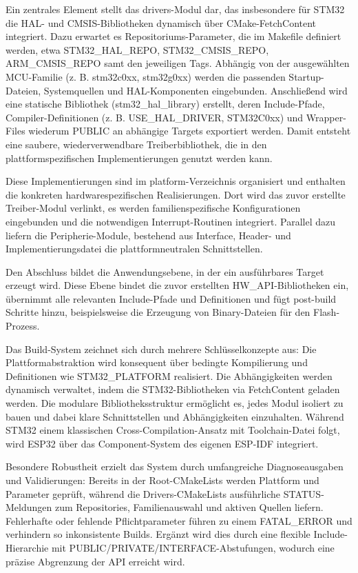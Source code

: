 Ein zentrales Element stellt das drivers-Modul dar, das insbesondere für STM32 die HAL- und CMSIS-Bibliotheken dynamisch über CMake-FetchContent integriert. 
Dazu erwartet es Repositoriums-Parameter, die im Makefile definiert werden, etwa STM32\_HAL\_REPO, STM32\_CMSIS\_REPO, ARM\_CMSIS\_REPO samt den jeweiligen Tags. 
Abhängig von der ausgewählten MCU-Familie (z. B. stm32c0xx, stm32g0xx) werden die passenden Startup-Dateien, Systemquellen und HAL-Komponenten eingebunden. 
Anschließend wird eine statische Bibliothek (stm32\_hal\_library) erstellt, deren Include-Pfade, Compiler-Definitionen (z. B. USE\_HAL\_DRIVER, STM32C0xx) und Wrapper-Files wiederum PUBLIC an abhängige Targets exportiert werden. 
Damit entsteht eine saubere, wiederverwendbare Treiberbibliothek, die in den plattformspezifischen Implementierungen genutzt werden kann.

Diese Implementierungen sind im platform-Verzeichnis organisiert und enthalten die konkreten hardwarespezifischen Realisierungen. 
Dort wird das zuvor erstellte Treiber-Modul verlinkt, es werden familienspezifische Konfigurationen eingebunden und die notwendigen Interrupt-Routinen integriert. 
Parallel dazu liefern die Peripherie-Module, bestehend aus Interface, Header- und Implementierungsdatei die plattformneutralen Schnittstellen.

Den Abschluss bildet die Anwendungsebene, in der ein ausführbares Target erzeugt wird. 
Diese Ebene bindet die zuvor erstellten HW\_API-Bibliotheken ein, übernimmt alle relevanten Include-Pfade und Definitionen und fügt post-build Schritte hinzu, beispielsweise die Erzeugung von Binary-Dateien für den Flash-Prozess.

Das Build-System zeichnet sich durch mehrere Schlüsselkonzepte aus: Die Plattformabstraktion wird konsequent über bedingte Kompilierung und Definitionen wie STM32\_PLATFORM realisiert.
Die Abhängigkeiten werden dynamisch verwaltet, indem die STM32-Bibliotheken via FetchContent geladen werden. 
Die modulare Bibliotheksstruktur ermöglicht es, jedes Modul isoliert zu bauen und dabei klare Schnittstellen und Abhängigkeiten einzuhalten. 
Während STM32 einem klassischen Cross-Compilation-Ansatz mit Toolchain-Datei folgt, wird ESP32 über das Component-System des eigenen ESP-IDF integriert.

Besondere Robustheit erzielt das System durch umfangreiche Diagnoseausgaben und Validierungen: Bereits in der Root-CMakeLists werden Plattform und Parameter geprüft, während die Drivers-CMakeLists ausführliche STATUS-Meldungen zum Repositories, Familienauswahl und aktiven Quellen liefern. 
Fehlerhafte oder fehlende Pflichtparameter führen zu einem FATAL\_ERROR und verhindern so inkonsistente Builds. 
Ergänzt wird dies durch eine flexible Include-Hierarchie mit PUBLIC/PRIVATE/INTERFACE-Abstufungen, wodurch eine präzise Abgrenzung der API erreicht wird.

